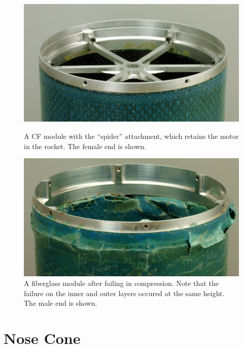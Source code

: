 \documentclass{aiaa-tc}%
\begin{document}
\begin{figure}[t]
	\centering
	\parbox{0.45\linewidth}
	{
		\centering
		\includegraphics[width=\linewidth]{../img/moduleWithSpider.png}
		\caption{A CF module with the ``spider'' attachment, which retains the motor in the rocket. The female end is shown.}
		\label{fig:module}
	}
	\hfill
	\parbox{0.45\linewidth}
	{
		\centering
		\includegraphics[width=\linewidth]{../img/FG_fracture.jpg}
		\caption{A fiberglass module after failing in compression. Note that the failure on the inner and outer layers occured at the same height. The male end is shown.}
		\label{fig:crush}
	}
\end{figure}

\section{Nose Cone}\label{sec:noseCone}

\end{document}
